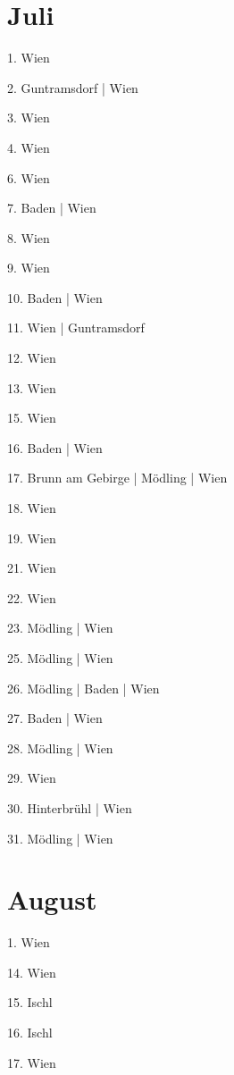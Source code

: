 \documentclass[twoside=false,titlepage=false,open=any, parskip=never, fontsize=10pt, headings=small, chapterprefix=false, appendixprefix=false, DIV=15]{scrbook}
\begin{document}
\begin{multicols}{3}
            \section*{Juli}
            1. Wien\par
            2. Guntramsdorf | Wien\par
            3. Wien\par
            4. Wien\par
            6. Wien\par
            7. Baden | Wien\par
            8. Wien\par
            9. Wien\par
            10. Baden | Wien\par
            11. Wien | Guntramsdorf\par
            12. Wien\par
            13. Wien\par
            15. Wien\par
            16. Baden | Wien\par
            17. Brunn am Gebirge | Mödling | Wien\par
            18. Wien\par
            19. Wien\par
            21. Wien\par
            22. Wien\par
            23. Mödling | Wien\par
            25. Mödling | Wien\par
            26. Mödling | Baden | Wien\par
            27. Baden | Wien\par
            28. Mödling | Wien\par
            29. Wien\par
            30. Hinterbrühl | Wien\par
            31. Mödling | Wien\par
            \section*{August}
            1. Wien\par
            14. Wien\par
            15. Ischl\par
            16. Ischl\par
            17. Wien\par

\end{multicols}
\end{document}

